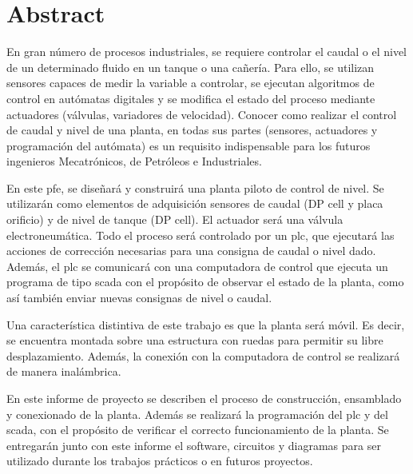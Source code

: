 \markboth{}{}
\pagestyle{empty}

\chapter*{Abstract}

En gran número de procesos industriales, se requiere controlar el caudal o el
nivel de un determinado fluido en un tanque o una cañería.
Para ello, se utilizan sensores capaces de medir la variable a
controlar, se ejecutan algoritmos de control en autómatas digitales y se
modifica el estado del proceso mediante actuadores (válvulas, variadores de
velocidad).
Conocer como realizar el control de caudal y nivel de una planta, en todas sus
partes (sensores, actuadores y programación del autómata) es un requisito
indispensable para los futuros ingenieros Mecatrónicos, de Petróleos e
Industriales.

En este \gls{pfe}, se diseñará y construirá una planta piloto de control de
nivel.
Se utilizarán como elementos de adquisición sensores de caudal (DP cell y placa
orificio) y de nivel de tanque (DP cell).
El actuador será una válvula electroneumática.
Todo el proceso será controlado por un \gls{plc},
que ejecutará las acciones de
corrección necesarias para una consigna de caudal o nivel dado.
Además, el \gls{plc} se comunicará con una computadora de control que ejecuta
un programa de tipo \gls{scada} con el propósito de observar el estado de la
planta, como así también enviar nuevas consignas de nivel o
caudal.

Una característica distintiva de este trabajo es que la planta será móvil.
Es decir, se encuentra montada sobre una estructura con ruedas para permitir su
libre desplazamiento.
Además, la conexión con la computadora de control se realizará de manera
inalámbrica.

En este informe de proyecto se describen el proceso de construcción,
ensamblado y conexionado de la planta.
Además se realizará la programación del \gls{plc} y del \gls{scada}, con el
propósito de verificar el correcto funcionamiento de la planta.
Se entregarán junto con este informe el software, circuitos y diagramas para
ser utilizado durante los trabajos prácticos o en futuros proyectos.
